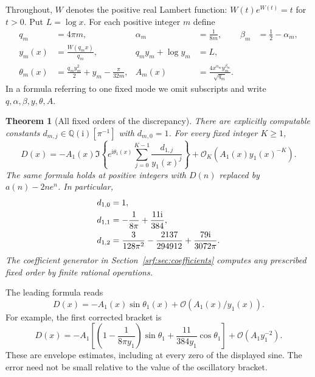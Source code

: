 \documentclass[11pt]{article}
\newtheorem{theorem}{Theorem}[section]
\theoremstyle{remark}\newtheorem{remark}[theorem]{Remark}
\newcommand{\OO}{\mathcal O}
\newcommand{\ii}{\mathrm i}
\begin{document}
Throughout, $W$ denotes the positive real Lambert function: $W(t)e^{W(t)}=t$ for $t>0$. Put $L=\log x$. For each positive integer $m$ define
\begin{align}
 q_m&=4\pi m,& \alpha_m&=\frac1{8m},& \beta_m&=\frac12-\alpha_m,\label{srf:eq:params}\\
 y_m(x)&=\frac{W(q_mx)}{q_m},&
 q_my_m+\log y_m&=L,\label{srf:eq:saddle}\\
 \theta_m(x)&=\frac{q_my_m^2}{2}+y_m-\frac{\pi}{32m},&
 A_m(x)&=\frac{4x^{\alpha_m}y_m^{\beta_m}}{\sqrt{q_m}}.\label{srf:eq:phase}
\end{align}
In a formula referring to one fixed mode we omit subscripts and write $q,\alpha,\beta,y,\theta,A$.

\begin{theorem}[All fixed orders of the discrepancy]\label{srf:thm:main}
There are explicitly computable constants $d_{m,j}\in\mathbb Q(\ii)[\pi^{-1}]$ with $d_{m,0}=1$. For every fixed integer $K\ge1$,
\begin{equation}\label{srf:eq:main}
 D(x)=-A_1(x)\Im\left\{e^{\ii\theta_1(x)}
          \sum_{j=0}^{K-1}\frac{d_{1,j}}{y_1(x)^j}\right\}
       +\OO_K\left(A_1(x)y_1(x)^{-K}\right).
\end{equation}
The same formula holds at positive integers with $D(n)$ replaced by $a(n)-2ne^n$. In particular,
\begin{align}
 d_{1,0}&=1,\notag\\
 d_{1,1}&=-\frac1{8\pi}+\frac{11\ii}{384},\label{srf:eq:d123}\\
 d_{1,2}&=\frac3{128\pi^2}-\frac{2137}{294912}
                    +\frac{79\ii}{3072\pi}.\notag
\end{align}
The coefficient generator in Section~\ref{srf:sec:coefficients} computes any prescribed fixed order by finite rational operations.
\end{theorem}

The leading formula reads
\begin{equation}\label{srf:eq:leading}
 D(x)=-A_1(x)\sin\theta_1(x)+\OO(A_1(x)/y_1(x)).
\end{equation}
For example, the first corrected bracket is
\[
 D(x)=-A_1\left[\left(1-\frac1{8\pi y_1}\right)\sin\theta_1
                    +\frac{11}{384y_1}\cos\theta_1\right]
       +\OO(A_1y_1^{-2}).
\]
These are envelope estimates, including at every zero of the displayed sine. The error need not be small relative to the value of the oscillatory bracket.
\end{document}
